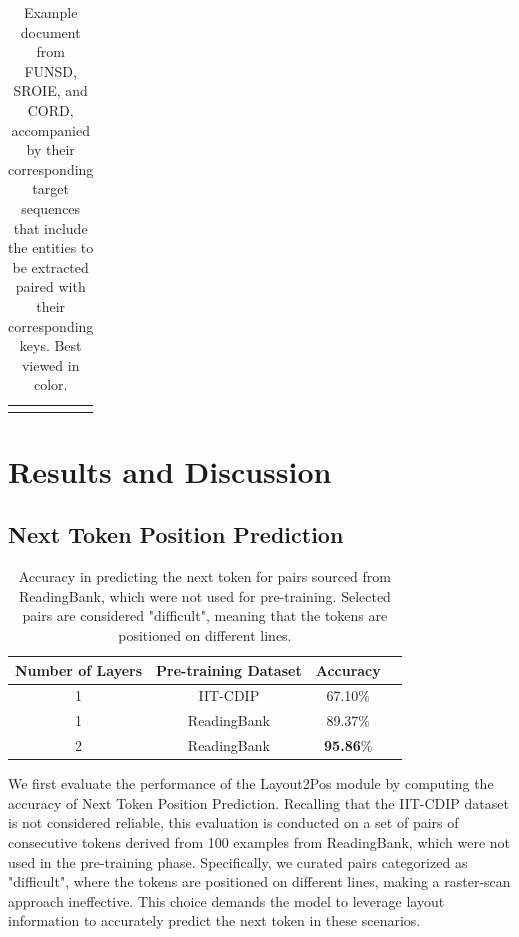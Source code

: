 \begin{table}[h!]
\begin{tabular}{  c | c | c  }
\begin{minipage}{.2\textwidth}
    \end{minipage}
    \\
  \end{tabular}
  \caption{Example document from FUNSD, SROIE, and CORD, accompanied by their corresponding target sequences that include the entities to be extracted paired with their corresponding keys. Best viewed in color.}
  \label{fig:source-target-sample}
\end{table}

\section{Results and Discussion}

\subsection{Next Token Position Prediction}
\label{section:layout2pos-results-ntpp}

\begin{table}
  \centering
  \small
  \begin{adjustbox}{max width=\textwidth}
  \begin{threeparttable}
  \begin{tabular}{cccc}
      \toprule
          Number of Layers & Pre-training Dataset & Accuracy \\ 
      \midrule
          1                & IIT-CDIP             & 67.10\%  \\
          1                & ReadingBank          & 89.37\%  \\
          2                & ReadingBank          & \textbf{95.86}\%   \\
      \bottomrule
  \end{tabular}
  \end{threeparttable}
  \end{adjustbox}
  \caption{Accuracy in predicting the next token for pairs sourced from ReadingBank, which were not used for pre-training. Selected pairs are considered "difficult", meaning that the tokens are positioned on different lines.}
  \label{table:next-token-prediction-results}
\end{table}

We first evaluate the performance of the Layout2Pos module by computing the accuracy of Next Token Position Prediction. Recalling that the IIT-CDIP dataset is not considered reliable, this evaluation is conducted on a set of pairs of consecutive tokens derived from 100 examples from ReadingBank, which were not used in the pre-training phase. Specifically, we curated pairs categorized as "difficult", where the tokens are positioned on different lines, making a raster-scan approach ineffective. This choice demands the model to leverage layout information to accurately predict the next token in these scenarios.

